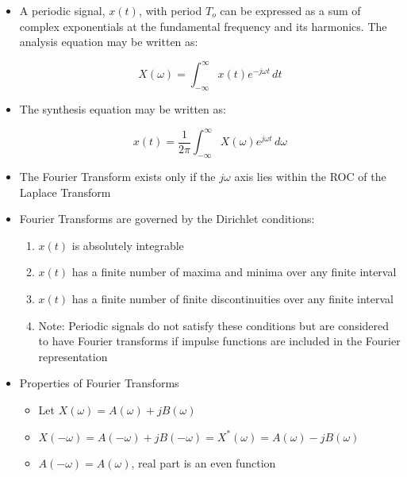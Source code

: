 \begin{itemize}

  \item A periodic signal, $x(t)$, with period $T_o$ can be expressed as a sum of complex exponentials at the fundamental frequency and its harmonics. The analysis equation may be written as:

    $$X(\omega)=\int_{-\infty}^{\infty} x(t)e^{-j\omega t}\,dt$$

  \item The synthesis equation may be written as:

    $$x(t)=\frac{1}{2\pi}\int_{-\infty}^{\infty}X(\omega)e^{j\omega t}\,d\omega$$

  \item The Fourier Transform exists only if the $j\omega$ axis lies within the ROC of the Laplace Transform

  \item Fourier Transforms are governed by the Dirichlet conditions:

    \begin{enumerate}

      \item $x(t)$ is absolutely integrable

      \item $x(t)$ has a finite number of maxima and minima over any finite interval

      \item $x(t)$ has a finite number of finite discontinuities over any finite interval

      \item Note: Periodic signals do not satisfy these conditions but are considered to have Fourier transforms if impulse functions are included in the Fourier representation

    \end{enumerate}

  \item Properties of Fourier Transforms

    \begin{itemize}

      \item Let $X(\omega)=A(\omega)+jB(\omega)$

      \item $X(-\omega)=A(-\omega)+jB(-\omega)=X^*(\omega)=A(\omega)-jB(\omega)$

      \item $A(-\omega)=A(\omega)$, real part is an even function


\end{itemize}
\end{itemize}
